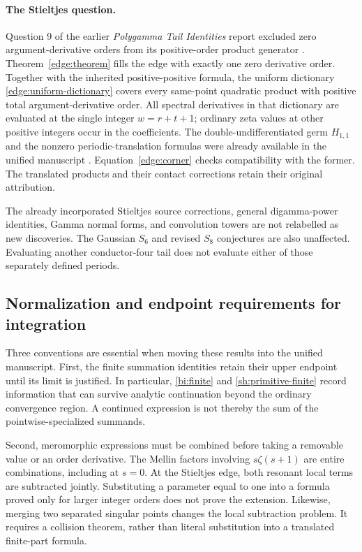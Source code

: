 \documentclass[11pt,letterpaper]{article}
\numberwithin{equation}{section}
\theoremstyle{definition}
\theoremstyle{remark}
\begin{document}
\paragraph{The Stieltjes question.}
Question 9 of the earlier \emph{Polygamma Tail Identities} report
excluded zero argument-derivative orders from its positive-order
product generator \cite{tail-polygamma}. Theorem~\ref{edge:theorem}
fills the edge with exactly one zero derivative order. Together with
the inherited positive-positive formula, the uniform dictionary
\eqref{edge:uniform-dictionary} covers every same-point quadratic
product with positive total argument-derivative order. All spectral
derivatives in that dictionary are evaluated at the single integer
$w=r+t+1$; ordinary zeta values at other positive integers occur in
the coefficients. The double-undifferentiated germ $H_{1,1}$ and the
nonzero periodic-translation formulas were already available in the
unified manuscript \cite{manuscript}. Equation~\eqref{edge:corner}
checks compatibility with the former. The translated products and
their contact corrections retain their original attribution.

The already incorporated Stieltjes source corrections, general
digamma-power identities, Gamma normal forms, and convolution towers
are not relabelled as new discoveries. The Gaussian $S_6$ and revised
$S_8$ conjectures are also unaffected. Evaluating another conductor-four
tail does not evaluate either of those separately defined periods.

\subsection{Normalization and endpoint requirements for integration}

Three conventions are essential when moving these results into the
unified manuscript. First, the finite summation identities retain their
upper endpoint until its limit is justified. In particular,
\eqref{bi:finite} and \eqref{sh:primitive-finite} record information
that can survive analytic continuation beyond the ordinary convergence
region. A continued expression is not thereby the sum of the
pointwise-specialized summands.

Second, meromorphic expressions must be combined before taking a
removable value or an order derivative. The Mellin factors involving
$s\zeta(s+1)$ are entire combinations, including at $s=0$.
At the Stieltjes edge, both resonant local terms are subtracted
jointly. Substituting a parameter equal to one into a formula proved
only for larger integer orders does not prove the extension.
Likewise, merging two separated singular points changes the local
subtraction problem. It requires a collision theorem, rather than
literal substitution into a translated finite-part formula.
\end{document}
